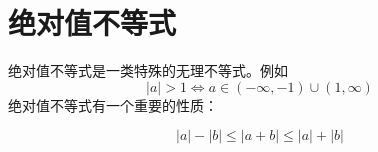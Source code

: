 \section{绝对值不等式}
绝对值不等式是一类特殊的无理不等式。例如
$$
    |a|>1 \iff a\in (-\infty, -1)\cup (1,\infty)
$$
绝对值不等式有一个重要的性质：
\begin{theorem}[三角不等式]
    $$
        |a|-|b| \le |a+b| \le |a|+|b|
    $$
\end{theorem}